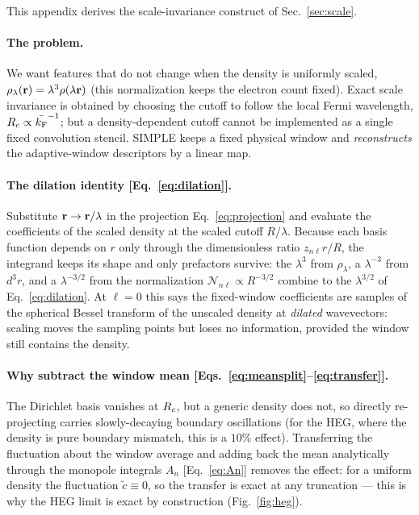 This appendix derives the scale-invariance construct of Sec.~\ref{sec:scale}.

\paragraph*{The problem.}
We want features that do not change when the density is uniformly scaled,
$\rho_\lambda(\mathbf{r})=\lambda^3\rho(\lambda\mathbf{r})$ (this normalization keeps the
electron count fixed). Exact scale invariance is obtained by choosing the cutoff
to follow the local Fermi wavelength, $R_{c}\propto\bar{k_{\mathrm{F}}}^{-1}$; but a
density-dependent cutoff cannot be implemented as a single fixed convolution
stencil. SIMPLE keeps a fixed physical window and \emph{reconstructs} the
adaptive-window descriptors by a linear map.

\paragraph*{The dilation identity [Eq.~\eqref{eq:dilation}].}
Substitute $\mathbf{r}\to\mathbf{r}/\lambda$ in the projection Eq.~\eqref{eq:projection} and
evaluate the coefficients of the scaled density at the scaled cutoff $R/\lambda$.
Because each basis function depends on $r$ only through the dimensionless ratio
$z_{n\ell}r/R$, the integrand keeps its shape and only prefactors survive: the
$\lambda^3$ from $\rho_\lambda$, a $\lambda^{-3}$ from $d^3r$, and a
$\lambda^{-3/2}$ from the normalization $\mathcal N_{n\ell}\propto R^{-3/2}$
combine to the $\lambda^{3/2}$ of Eq.~\eqref{eq:dilation}. At $\ell=0$ this says
the fixed-window coefficients are samples of the spherical Bessel transform of the
unscaled density at \emph{dilated} wavevectors: scaling moves the sampling points
but loses no information, provided the window still contains the density.

\paragraph*{Why subtract the window mean [Eqs.~\eqref{eq:meansplit}--\eqref{eq:transfer}].}
The Dirichlet basis vanishes at $R_{c}$, but a generic density does not, so directly
re-projecting carries slowly-decaying boundary oscillations (for the HEG, where
the density is pure boundary mismatch, this is a $10\%$ effect). Transferring the
fluctuation about the window average and adding back the mean analytically through
the monopole integrals $A_n$ [Eq.~\eqref{eq:An}] removes the effect: for a uniform
density the fluctuation $\tilde c\equiv0$, so the transfer is exact at any
truncation --- this is why the HEG limit is exact by construction
(Fig.~\ref{fig:heg}).

